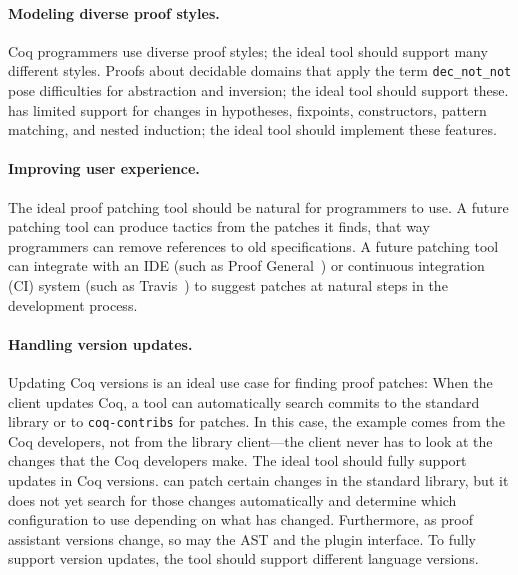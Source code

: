 \paragraph{Modeling diverse proof styles.} Coq programmers use diverse proof styles;
the ideal tool should support many different styles.
Proofs about decidable domains that apply the term \lstinline{dec_not_not}
pose difficulties for abstraction and inversion; the ideal tool should support these. 
\sysname has limited support for changes in hypotheses, fixpoints, constructors, 
pattern matching, and nested induction; the ideal tool should implement these features.

\paragraph{Improving user experience.} The ideal proof patching tool should
be natural for programmers to use. A future patching tool
can produce tactics from the patches it finds, that way programmers
can remove references to old specifications. A future patching tool can integrate 
with an IDE (such as Proof General~\cite{proofgeneral})
or continuous integration (CI) system (such as Travis~\cite{travis}) to suggest
patches at natural steps in the development process.


\paragraph{Handling version updates.} Updating Coq versions is an ideal use case for finding proof patches:
When the client updates Coq, a tool can automatically search commits to the standard library or to \lstinline{coq-contribs}
for patches.
In this case, the example comes from the Coq developers, not from the library client---the 
client never has to look at the changes that the Coq developers make.
The ideal tool should fully support updates in Coq versions.
\sysname can patch certain changes in the standard library, but it 
does not yet search for those changes automatically and determine which configuration to use depending on
what has changed. Furthermore, as proof assistant versions change, so may the AST and the plugin interface.
To fully support version updates, the tool should support different language versions.

